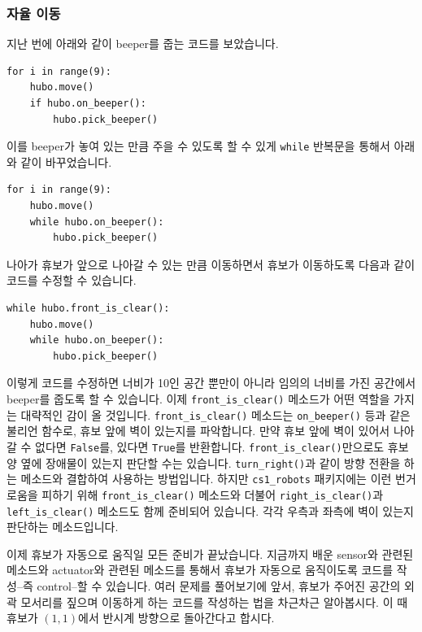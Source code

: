\documentclass[../main.tex]{subfiles}
\begin{document}
\subsubsection{자율 이동}
지난 번에 아래와 같이 beeper를 줍는 코드를 보았습니다.
\begin{verbatim}
for i in range(9):
    hubo.move()
    if hubo.on_beeper():
        hubo.pick_beeper()
\end{verbatim}
이를 beeper가 놓여 있는 만큼 주을 수 있도록 할 수 있게 \texttt{while} 반복문을 통해서 아래와 같이 바꾸었습니다.
\begin{verbatim}
for i in range(9):
    hubo.move()
    while hubo.on_beeper():
        hubo.pick_beeper()
\end{verbatim}
나아가 휴보가 앞으로 나아갈 수 있는 만큼 이동하면서 휴보가 이동하도록 다음과 같이 코드를 수정할 수 있습니다.
\begin{verbatim}
while hubo.front_is_clear():
    hubo.move()
    while hubo.on_beeper():
        hubo.pick_beeper()
\end{verbatim}
이렇게 코드를 수정하면 너비가 10인 공간 뿐만이 아니라 임의의 너비를 가진 공간에서 beeper를 줍도록 할 수 있습니다.
이제 \texttt{front\_is\_clear()} 메소드가 어떤 역할을 가지는 대략적인 감이 올 것입니다.
\texttt{front\_is\_clear()} 메소드는 \texttt{on\_beeper()} 등과 같은 불리언 함수로, 휴보 앞에 벽이 있는지를 파악합니다.
만약 휴보 앞에 벽이 있어서 나아갈 수 없다면 \texttt{False}를, 있다면 \texttt{True}를 반환합니다.
\texttt{front\_is\_clear()}만으로도 휴보 양 옆에 장애물이 있는지 판단할 수는 있습니다.
\texttt{turn\_right()}과 같이 방향 전환을 하는 메소드와 결합하여 사용하는 방법입니다.
하지만 \texttt{cs1\_robots} 패키지에는 이런 번거로움을 피하기 위해 \texttt{front\_is\_clear()} 메소드와 더불어 \texttt{right\_is\_clear()}과 \texttt{left\_is\_clear()} 메소드도 함께 준비되어 있습니다.
각각 우측과 좌측에 벽이 있는지 판단하는 메소드입니다.

이제 휴보가 자동으로 움직일 모든 준비가 끝났습니다.
지금까지 배운 sensor와 관련된 메소드와 actuator와 관련된 메소드를 통해서 휴보가 자동으로 움직이도록 코드를 작성--즉 control--할 수 있습니다.
여러 문제를 풀어보기에 앞서, 휴보가 주어진 공간의 외곽 모서리를 짚으며 이동하게 하는 코드를 작성하는 법을 차근차근 알아봅시다.
이 때 휴보가 $(1, 1)$에서 반시계 방향으로 돌아간다고 합시다.
\end{document}
